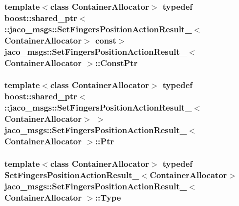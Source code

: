 \subsubsection[{\texorpdfstring{Const\+Ptr}{ConstPtr}}]{\setlength{\rightskip}{0pt plus 5cm}template$<$class Container\+Allocator$>$ typedef boost\+::shared\+\_\+ptr$<$ \+::{\bf jaco\+\_\+msgs\+::\+Set\+Fingers\+Position\+Action\+Result\+\_\+}$<$Container\+Allocator$>$ const$>$ {\bf jaco\+\_\+msgs\+::\+Set\+Fingers\+Position\+Action\+Result\+\_\+}$<$ Container\+Allocator $>$\+::{\bf Const\+Ptr}}\hypertarget{structjaco__msgs_1_1SetFingersPositionActionResult___a368570cbffaf720aea48642ec7c8829e}{}\label{structjaco__msgs_1_1SetFingersPositionActionResult___a368570cbffaf720aea48642ec7c8829e}
\subsubsection[{\texorpdfstring{Ptr}{Ptr}}]{\setlength{\rightskip}{0pt plus 5cm}template$<$class Container\+Allocator$>$ typedef boost\+::shared\+\_\+ptr$<$ \+::{\bf jaco\+\_\+msgs\+::\+Set\+Fingers\+Position\+Action\+Result\+\_\+}$<$Container\+Allocator$>$ $>$ {\bf jaco\+\_\+msgs\+::\+Set\+Fingers\+Position\+Action\+Result\+\_\+}$<$ Container\+Allocator $>$\+::{\bf Ptr}}\hypertarget{structjaco__msgs_1_1SetFingersPositionActionResult___a3ddc98892b0e2d7b1853973b9fd24322}{}\label{structjaco__msgs_1_1SetFingersPositionActionResult___a3ddc98892b0e2d7b1853973b9fd24322}
\subsubsection[{\texorpdfstring{Type}{Type}}]{\setlength{\rightskip}{0pt plus 5cm}template$<$class Container\+Allocator$>$ typedef {\bf Set\+Fingers\+Position\+Action\+Result\+\_\+}$<$Container\+Allocator$>$ {\bf jaco\+\_\+msgs\+::\+Set\+Fingers\+Position\+Action\+Result\+\_\+}$<$ Container\+Allocator $>$\+::{\bf Type}}\hypertarget{structjaco__msgs_1_1SetFingersPositionActionResult___ab425bbd950edd7263d5b580ebae81577}{}\label{structjaco__msgs_1_1SetFingersPositionActionResult___ab425bbd950edd7263d5b580ebae81577}


